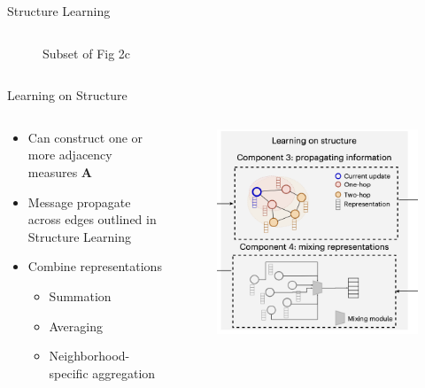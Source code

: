 \documentclass{beamer}
\begin{document}
\begin{frame}{Structure Learning}
\begin{columns}[T]
\begin{column}{0.5\textwidth}
\begin{figure}
            \caption{Subset of Fig 2c \cite{ektefaie_multimodal_2023}}
        \end{figure}    
    \end{column}
\end{columns}
\end{frame}



\begin{frame}{Learning on Structure}
    \begin{columns}[T]
    \begin{column}{0.5\textwidth}
        \begin{itemize}
            \item Can construct one or more adjacency measures $\mathbf{A}$ 
            \item Message propagate across edges outlined in Structure Learning 
            \item Combine representations 
            \begin{itemize}
                \item Summation 
                \item Averaging 
                \item Neighborhood-specific aggregation
            \end{itemize}
        \end{itemize}      
    \end{column}
    \begin{column}{0.5\textwidth}
        \begin{figure}
            \includegraphics[scale=0.4]{Ektefaie_OnStructure.png}

\end{figure}
\end{column}
\end{columns}
\end{frame}
\end{document}
